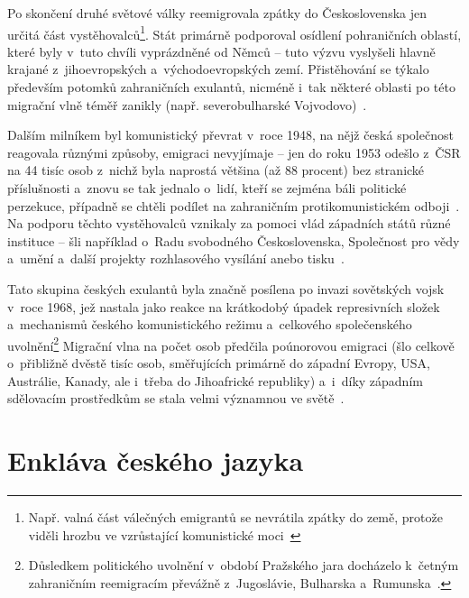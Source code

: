Po skončení druhé světové války reemigrovala zpátky do Československa jen určitá část vystěhovalců\footnote{Např. valná část válečných emigrantů se nevrátila zpátky do země, protože viděli hrozbu ve vzrůstající komunistické moci~\parencite{Vaculik2009a}}. Stát primárně podporoval osídlení pohraničních oblastí, které byly v~tuto chvíli vyprázdněné od Němců -- tuto výzvu vyslyšeli hlavně krajané z~jihoevropských a~východoevropských zemí. Přistěhování se týkalo především potomků zahraničních exulantů, nicméně i~tak některé oblasti po této migrační vlně téměř zanikly (např. severobulharské Vojvodovo)~\parencite{Nespor2005}.

Dalším milníkem byl komunistický převrat v~roce 1948, na nějž česká společnost reagovala různými způsoby, emigraci nevyjímaje -- jen do roku 1953 odešlo z~ČSR na 44 tisíc osob z~nichž byla naprostá většina (až 88 procent) bez stranické příslušnosti a~znovu se tak jednalo o~lidí, kteří se zejména báli politické perzekuce, případně se chtěli podílet na zahraničním protikomunistickém odboji~\parencite{Vaculik2002}. Na podporu těchto vystěhovalců vznikaly za pomoci vlád západních států různé instituce -- šli například o~Radu svobodného Československa, Společnost pro vědy a~umění a~další projekty rozhlasového vysílání anebo tisku~\parencite{Nespor2005}.

Tato skupina českých exulantů byla značně posílena po invazi sovětských vojsk v~roce 1968, jež nastala jako reakce na krátkodobý úpadek represivních složek a~mechanismů českého komunistického režimu a~celkového společenského uvolnění\footnote{Důsledkem politického uvolnění v~období Pražského jara docházelo k~četným zahraničním reemigracím převážně z~Jugoslávie, Bulharska a~Rumunska~\parencite{Nespor2005}.} Migrační vlna na počet osob předčila poúnorovou emigraci (šlo celkově o~přibližně dvěstě tisíc osob, směřujících primárně do západní Evropy, USA, Austrálie, Kanady, ale i~třeba do Jihoafrické republiky) a~i~díky západním sdělovacím prostředkům se stala velmi významnou ve světě~\parencite{Vaculik2002}.

\hypertarget{enkluxe1va-ux10deskuxe9ho-jazyka}{%
\section{Enkláva českého jazyka}\label{enkluxe1va-ux10deskuxe9ho-jazyka}}
